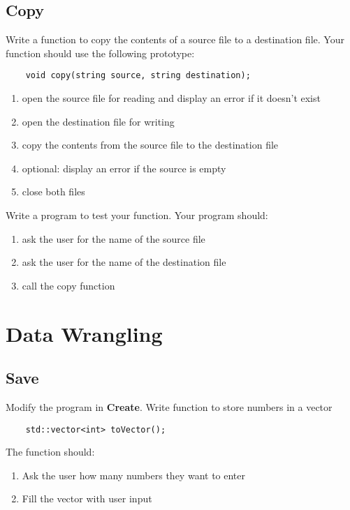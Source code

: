 \documentclass{article}
\begin{document}
\subsection{Copy}
Write a function to copy the contents of a source file to a destination file. Your function should use the following prototype:
\begin{verbatim}
	void copy(string source, string destination);
\end{verbatim}
\begin{enumerate}
	\item open the source file for reading and display an error if it doesn't exist
	\item open the destination file for writing
	\item copy the contents from the source file to the destination file
	\item optional: display an error if the source is empty
	\item close both files
\end{enumerate}
Write a program to test your function. Your program should:
\begin{enumerate}
	\item ask the user for the name of the source file 
	\item ask the user for the name of the destination file
	\item call the copy function
\end{enumerate}

\section{Data Wrangling}
\subsection{Save}
Modify the program in \textbf{Create}. Write function to store numbers in a vector
\begin{verbatim}
	std::vector<int> toVector();
\end{verbatim}
The function should:
\begin{enumerate}
	\item Ask the user how many numbers they want to enter
	\item Fill the vector with user input
\end{enumerate}
\end{document}
